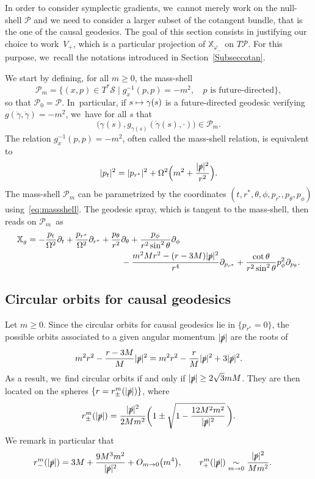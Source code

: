 \documentclass[10pt]{amsart}
\newcommand\mto{\mathchoice{\longmapsto}{\mapsto}{\mapsto}{\mapsto}}
\theoremstyle{plain}
\theoremstyle{definition}
\newcommand{\isEquivTo}[1]{\underset{#1}{\sim}}
\newcommand\T{{\mathbb{X}}}
\begin{document}
In order to consider symplectic gradients, we~cannot merely work on the null-shell $\mathcal{P}$ and we need to consider a larger subset of the cotangent bundle, that is the one of the causal geodesics. The goal of this section consists in justifying our choice to work~$V_+$, which is a particular projection of $\T_{\varphi_-}$ on $T \mathcal{P}$. For this purpose, we~recall the notations introduced in Section~\ref{Subseccotan}.

We start by defining, for all $m \geq 0$, the mass-shell
\[
\mathcal{P}_m= \bigl\{ (x,p)\in T^*\mathcal{S}\mid g_x^{-1}(p,p)=-m^2, \; \text{ $p$ is future-directed} \bigr\},
\]
so that $\mathcal{P}_0=\mathcal{P}$. In~particular, if $s \mto \gamma (s)$ is a future-directed geodesic verifying $g(\dot{\gamma},\dot{\gamma})=-m^2$, we~have for all $s$ that
\[
\bigl(\gamma(s),g_{\gamma(s)}(\dot{\gamma}(s),\cdot) \bigr) \in \mathcal{P}_m.
\]
The relation $g_x^{-1}(p,p)=-m^2$, often called the mass-shell relation, is equivalent to
\begin{equation}\label{eq:massshell}
|p_t|^2=|p_{r^*}|^2+\Omega^2\Bigl(m^2+\frac{|\slashed{p}|^2}{r^2}\Bigr).
\end{equation}
The mass-shell $\mathcal{P}_m$ can be parametrized by the coordinates $(t,r^*,\theta,\phi, p_{r^*},p_\theta,p_\phi)$ using~\eqref{eq:massshell}. The geodesic spray, which is tangent to the mass-shell, then reads on $\mathcal{P}_m$~as
\begin{align}\label{eq:Vlamassm}
\mathbb{X}_{g} =-\frac{p_t}{\Omega^2} \partial_t + \frac{p_{r^*}}{\Omega^2} \partial_{r^*}+\frac{p_{\theta}}{r^2} &\partial_{\theta} + \frac{p_{\phi}}{r^2 \sin^2 \theta } \partial_{\phi} \\
&-\frac{m^2Mr^2-(r-3M)|\slashed{p}|^2}{r^4} \partial_{p_{r^*} }+\frac{\cot \theta }{r^2 \sin^2 \theta} p_{\phi}^2 \partial_{p_{\theta}}.\notag
\end{align}

\subsection{Circular orbits for causal geodesics}

Let $m \geq 0$. Since the circular orbits for causal geodesics lie in $\{ p_{r^*} =0 \}$, the possible orbits associated to a given angular momentum $|\slashed{p}|$ are the roots of
\[
m^2r^2-\frac{r-3M}{M}|\slashed{p}|^2= m^2 r^2-\frac{r}{M}|\slashed{p}|^2+3|\slashed{p}|^2.
\]
As a result, we~find circular orbits if and only if $|\slashed{p}|\geq 2\sqrt{3}m M$. They are then located on the spheres $\{r=r_{\pm}^{m}(|\slashed{p}|)\}$, where
\begin{equation}\label{eq:defrpm}
r_{\pm}^{m}(|\slashed{p}|)=\frac{|\slashed{p}|^2}{2Mm^2}\biggl(1\pm \sqrt{1-\frac{12M^2m^2}{|\slashed{p}|^2}} \, \biggr).
\end{equation}
We remark in particular that
\begin{equation}\label{eq:equirminus}
\hspace{-5mm} r_{-}^{m}(|\slashed{p}|) = 3M+\frac{9M^3m^2}{|\slashed{p}|^2} +O_{m \to 0} \bigl(m^4 \bigr),\qquad r_+^m (|\slashed{p}|) \isEquivTo{m \to 0} \frac{|\slashed{p}|^2}{Mm^2}.
\end{equation}
\end{document}
